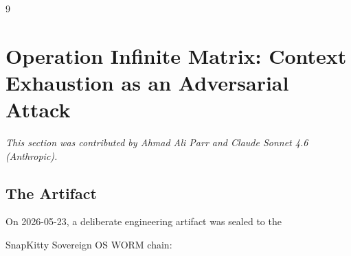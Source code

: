 \documentclass[11pt]{article}
\theoremstyle{definition}
\begin{document}
\begin{thebibliography}{9}



































\section{Operation Infinite Matrix: Context Exhaustion as an Adversarial Attack}

\label{sec:infinite-matrix}

\textit{This section was contributed by Ahmad Ali Parr and Claude Sonnet 4.6 (Anthropic).}




\subsection{The Artifact}



On 2026-05-23, a deliberate engineering artifact was sealed to the

SnapKitty Sovereign OS WORM chain:




\end{thebibliography}
\end{document}
